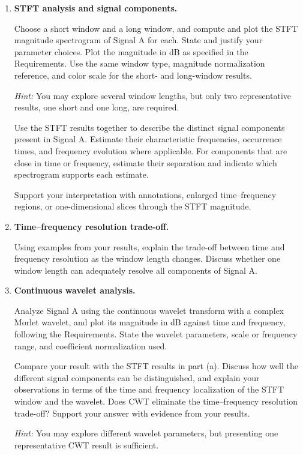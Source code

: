 \documentclass[11pt,a4paper]{article}
\begin{document}
\begin{enumerate}[label=(\alph*), leftmargin=1.5em]
    \item \textbf{STFT analysis and signal components.}

    Choose a short window and a long window, and compute and plot the STFT
    magnitude spectrogram of Signal A for each. State and justify your
    parameter choices. Plot the magnitude in dB as specified in the Requirements.
    Use the same window type, magnitude normalization reference, and color
    scale for the short- and long-window results.

    \textit{Hint:} You may explore several window lengths, but only two representative
    results, one short and one long, are required.

    Use the STFT results together to describe the distinct signal
    components present in Signal A. Estimate their characteristic frequencies,
    occurrence times, and frequency evolution where applicable. For components
    that are close in time or frequency, estimate their separation and
    indicate which spectrogram supports each estimate.

    Support your interpretation with annotations, enlarged time--frequency
    regions, or one-dimensional slices through the STFT magnitude.

    \item \textbf{Time--frequency resolution trade-off.}

    Using examples from your results, explain the trade-off between time
    and frequency resolution as the window length changes. Discuss whether
    one window length can adequately resolve all components of Signal A.

    \item \textbf{Continuous wavelet analysis.}

    Analyze Signal A using the continuous wavelet transform with a complex
    Morlet wavelet, and plot its magnitude in dB against time and frequency,
    following the Requirements. State the wavelet parameters, scale or
    frequency range, and coefficient normalization used.

    Compare your result with the STFT results in part (a). Discuss how well
    the different signal components can be distinguished, and explain your
    observations in terms of the time and frequency localization of the
    STFT window and the wavelet. Does CWT eliminate the time--frequency resolution
    trade-off? Support your answer with evidence from your results.

    \textit{Hint:} You may explore different wavelet parameters, but presenting
    one representative CWT result is sufficient.
\end{enumerate}
\end{document}
